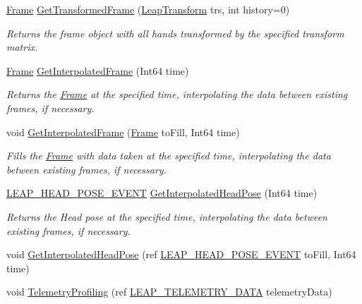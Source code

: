 \begin{DoxyCompactItemize}
\mbox{\hyperlink{class_leap_1_1_frame}{Frame}} \mbox{\hyperlink{class_leap_1_1_controller_ac8b0d112dcaa36505057f7787a0dedda}{Get\+Transformed\+Frame}} (\mbox{\hyperlink{struct_leap_1_1_leap_transform}{Leap\+Transform}} trs, int history=0)
\begin{DoxyCompactList}\small\item\em Returns the frame object with all hands transformed by the specified transform matrix. \end{DoxyCompactList}\item 
\mbox{\hyperlink{class_leap_1_1_frame}{Frame}} \mbox{\hyperlink{class_leap_1_1_controller_aa99cf433f25105c63083d9b6f6ded2e9}{Get\+Interpolated\+Frame}} (Int64 time)
\begin{DoxyCompactList}\small\item\em Returns the \mbox{\hyperlink{class_leap_1_1_frame}{Frame}} at the specified time, interpolating the data between existing frames, if necessary. \end{DoxyCompactList}\item 
void \mbox{\hyperlink{class_leap_1_1_controller_a44c7a28591b2dab45849aa03640b4889}{Get\+Interpolated\+Frame}} (\mbox{\hyperlink{class_leap_1_1_frame}{Frame}} to\+Fill, Int64 time)
\begin{DoxyCompactList}\small\item\em Fills the \mbox{\hyperlink{class_leap_1_1_frame}{Frame}} with data taken at the specified time, interpolating the data between existing frames, if necessary. \end{DoxyCompactList}\item 
\mbox{\hyperlink{struct_leap_internal_1_1_l_e_a_p___h_e_a_d___p_o_s_e___e_v_e_n_t}{L\+E\+A\+P\+\_\+\+H\+E\+A\+D\+\_\+\+P\+O\+S\+E\+\_\+\+E\+V\+E\+NT}} \mbox{\hyperlink{class_leap_1_1_controller_a569698b8f3bfbf04216145f4c39d317a}{Get\+Interpolated\+Head\+Pose}} (Int64 time)
\begin{DoxyCompactList}\small\item\em Returns the Head pose at the specified time, interpolating the data between existing frames, if necessary. \end{DoxyCompactList}\item 
void \mbox{\hyperlink{class_leap_1_1_controller_a3a249a28db2fc7e0088440d55a290638}{Get\+Interpolated\+Head\+Pose}} (ref \mbox{\hyperlink{struct_leap_internal_1_1_l_e_a_p___h_e_a_d___p_o_s_e___e_v_e_n_t}{L\+E\+A\+P\+\_\+\+H\+E\+A\+D\+\_\+\+P\+O\+S\+E\+\_\+\+E\+V\+E\+NT}} to\+Fill, Int64 time)
\item 
void \mbox{\hyperlink{class_leap_1_1_controller_a0992fb52095c6948ab685dada1abfa2d}{Telemetry\+Profiling}} (ref \mbox{\hyperlink{struct_leap_internal_1_1_l_e_a_p___t_e_l_e_m_e_t_r_y___d_a_t_a}{L\+E\+A\+P\+\_\+\+T\+E\+L\+E\+M\+E\+T\+R\+Y\+\_\+\+D\+A\+TA}} telemetry\+Data)

\end{DoxyCompactItemize}
